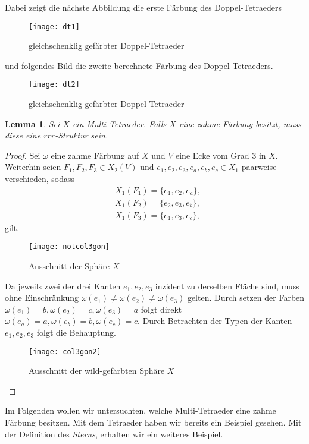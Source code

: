 \documentclass[12pt,titlepage,twoside,cleardoublepage]{article}
\theoremstyle{nummermitklammern}
\newtheorem{lemma}[temp]{Lemma}
\newtheorem{lemma}[zahl]{Lemma}
\numberwithin{equation}{section}
\begin{document}
Dabei zeigt die nächste Abbildung die erste Färbung des Doppel-Tetraeders 
\begin{figure}[H]
\begin{center}
\texttt{[image: dt1]}
\end{center}
\caption{gleichschenklig gefärbter Doppel-Tetraeder}
\end{figure}
und folgendes Bild die zweite berechnete Färbung des Doppel-Tetraeders.
\begin{figure}[H]
\begin{center}
\texttt{[image: dt2]}
\end{center}
\caption{gleichschenklig gefärbter Doppel-Tetraeder}
\end{figure}
\begin{lemma}
Sei $X$ ein Multi-Tetraeder. Falls $X$ eine zahme Färbung besitzt, muss diese eine $rrr$-Struktur sein.
\end{lemma}
\begin{proof}
Sei $\omega$ eine zahme Färbung auf $X$ und $V$ eine Ecke vom Grad 3 in $X.$ Weiterhin seien $F_1,F_2,F_3\in X_2(V)$ und $e_1,e_2,e_3,e_a,e_b,e_c\in X_1$ paarweise verschieden, sodass 
\begin{align*}
&X_1(F_1)=\{e_1,e_2,e_a\},\\
&X_1(F_2)=\{e_2,e_3,e_b\}, \\
&X_1(F_3)=\{e_1,e_3,e_c\},
\end{align*}
gilt.
\begin{figure}[H]
\begin{center}
\texttt{[image: notcol3gon]}
\end{center}
\caption{Ausschnitt der Sphäre $X$}
\end{figure}
Da jeweils zwei der drei Kanten $e_1,e_2,e_3$ inzident zu derselben Fläche sind, muss ohne Einschränkung $\omega(e_1)\neq\omega(e_2)\neq\omega(e_3)$ gelten. Durch setzen der Farben $\omega(e_1)=b,\omega(e_2)=c,\omega(e_3)=a$ folgt direkt $\omega(e_a)=a,\omega(e_b)=b,\omega(e_c)=c.$  Durch Betrachten der Typen der Kanten $e_1,e_2,e_3$ folgt die Behauptung.
\begin{figure}[H]
\begin{center}
\texttt{[image: col3gon2]}
\end{center}
\caption{Ausschnitt der wild-gefärbten Sphäre $X$}
\end{figure}
\end{proof}
Im Folgenden wollen wir untersuchten, welche Multi-Tetraeder eine zahme Färbung besitzen. Mit dem Tetraeder haben wir bereits ein Beispiel gesehen. Mit der Definition des \emph{Sterns}, erhalten wir ein weiteres Beispiel.
\end{document}
